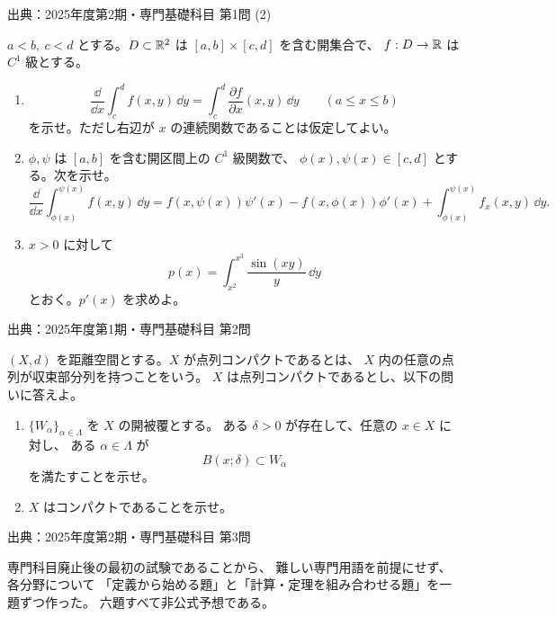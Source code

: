 \vfill
{\small\color{muted}出典：2025年度第2期・専門基礎科目 第1問 (2)}


\(a<b,\ c<d\) とする。\(D\subset\mathbb R^2\) は
\([a,b]\times[c,d]\) を含む開集合で、
\(f:D\to\mathbb R\) は \(C^1\) 級とする。

\begin{enumerate}
  \item
  \[
  \frac{\dd}{\dd x}\int_c^d f(x,y)\,\dd y
  =\int_c^d\frac{\partial f}{\partial x}(x,y)\,\dd y
  \qquad(a\le x\le b)
  \]
  を示せ。ただし右辺が \(x\) の連続関数であることは仮定してよい。
  \item \(\phi,\psi\) は \([a,b]\) を含む開区間上の \(C^1\) 級関数で、
  \(\phi(x),\psi(x)\in[c,d]\) とする。次を示せ。
  \[
  \frac{\dd}{\dd x}\int_{\phi(x)}^{\psi(x)}f(x,y)\,\dd y
  =
  f(x,\psi(x))\psi'(x)-f(x,\phi(x))\phi'(x)
  +\int_{\phi(x)}^{\psi(x)}f_x(x,y)\,\dd y.
  \]
  \item \(x>0\) に対して
  \[
  p(x)=\int_{x^2}^{x^3}\frac{\sin(xy)}{y}\,\dd y
  \]
  とおく。\(p'(x)\) を求めよ。
\end{enumerate}

\vfill
{\small\color{muted}出典：2025年度第1期・専門基礎科目 第2問}


\((X,d)\) を距離空間とする。\(X\) が点列コンパクトであるとは、
\(X\) 内の任意の点列が収束部分列を持つことをいう。
\(X\) は点列コンパクトであるとし、以下の問いに答えよ。

\begin{enumerate}
  \item \(\{W_\alpha\}_{\alpha\in\Lambda}\) を \(X\) の開被覆とする。
  ある \(\delta>0\) が存在して、任意の \(x\in X\) に対し、
  ある \(\alpha\in\Lambda\) が
  \[
  B(x;\delta)\subset W_\alpha
  \]
  を満たすことを示せ。
  \item \(X\) はコンパクトであることを示せ。
\end{enumerate}

\vfill
{\small\color{muted}出典：2025年度第2期・専門基礎科目 第3問}



\begin{pointbox}[作問方針]
専門科目廃止後の最初の試験であることから、
難しい専門用語を前提にせず、各分野について
「定義から始める題」と「計算・定理を組み合わせる題」を一題ずつ作った。
六題すべて非公式予想である。
\end{pointbox}

